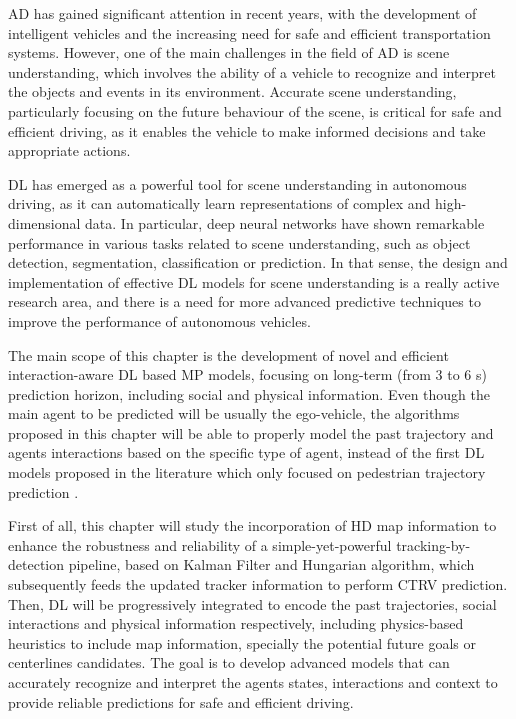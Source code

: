 \ac{AD} has gained significant attention in recent years, with the development of intelligent vehicles and the increasing need for safe and efficient transportation systems. However, one of the main challenges in the field of \ac{AD} is scene understanding, which involves the ability of a vehicle to recognize and interpret the objects and events in its environment. Accurate scene understanding, particularly focusing on the future behaviour of the scene, is critical for safe and efficient driving, as it enables the vehicle to make informed decisions and take appropriate actions.

\ac{DL} has emerged as a powerful tool for scene understanding in autonomous driving, as it can automatically learn representations of complex and high-dimensional data. In particular, deep neural networks have shown remarkable performance in various tasks related to scene understanding, such as object detection, segmentation, classification or prediction. In that sense, the design and implementation of effective \ac{DL} models for scene understanding is a really active research area, and there is a need for more advanced predictive techniques to improve the performance of autonomous vehicles.

The main scope of this chapter is the development of novel and efficient interaction-aware \ac{DL} based \ac{MP} models, focusing on long-term (from 3 to 6 s) prediction horizon, including social and physical information. Even though the main agent to be predicted will be usually the ego-vehicle, the algorithms proposed in this chapter will be able to properly model the past trajectory and agents interactions based on the specific type of agent, instead of the first \ac{DL} models proposed in the literature which only focused on pedestrian trajectory prediction \cite{alahi2016social, gupta2018social, sadeghian2019sophie}. 

First of all, this chapter will study the incorporation of HD map information to enhance the robustness and reliability of a simple-yet-powerful tracking-by-detection pipeline, based on Kalman Filter and Hungarian algorithm, which subsequently feeds the updated tracker information to perform \ac{CTRV} prediction. Then, \ac{DL} will be progressively integrated to encode the past trajectories, social interactions and physical information respectively, including physics-based heuristics to include map information, specially the potential future goals or centerlines candidates. The goal is to develop advanced models that can accurately recognize and interpret the agents states, interactions and context to provide reliable predictions for safe and efficient driving. 

